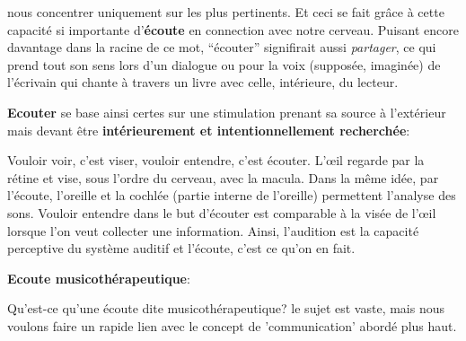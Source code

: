 nous concentrer uniquement sur les plus  pertinents. Et ceci se fait grâce à cette capacité si importante
d'\textbf{écoute} en connection avec notre cerveau.
Puisant encore davantage dans  la racine de ce mot, ``écouter'' signifirait
aussi \emph{partager}, ce qui prend tout son sens lors d'un dialogue ou
pour la voix (supposée, imaginée) de  l'écrivain qui
 chante à travers un livre avec celle, intérieure, du lecteur.


  \textbf{Ecouter} se base ainsi certes sur une stimulation prenant sa source à
l'extérieur mais devant être \textbf{ intérieurement et intentionnellement
	recherchée}:

  Vouloir voir, c'est viser, vouloir entendre, c'est
      écouter.
  L'\oe il regarde par la rétine et  vise, sous l'ordre du
  cerveau, avec la macula. Dans la même idée, par l'écoute,
  l'oreille et la cochlée (partie interne de l'oreille) permettent
  l'analyse des sons. Vouloir entendre dans le but d'écouter est comparable  à
  la visée de l'\oe il lorsque l'on veut collecter une
  information.
   Ainsi, l'audition est la capacité perceptive du système auditif et l'écoute, c'est ce qu'on en fait.


      \textbf{Ecoute musicothérapeutique}:


Qu'est-ce qu'une écoute dite musicothérapeutique? le sujet est vaste, mais nous voulons faire un rapide lien avec le concept de 'communication' abordé plus haut.



